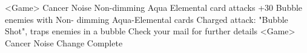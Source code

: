<Game> Cancer Noise 
Non-dimming Aqua Elemental card attacks +30 
Bubble enemies with Non- dimming Aqua-Elemental cards 
Charged attack: "Bubble Shot", 
traps enemies in a bubble Check your mail for further details 
<Game> Cancer Noise Change Complete 
